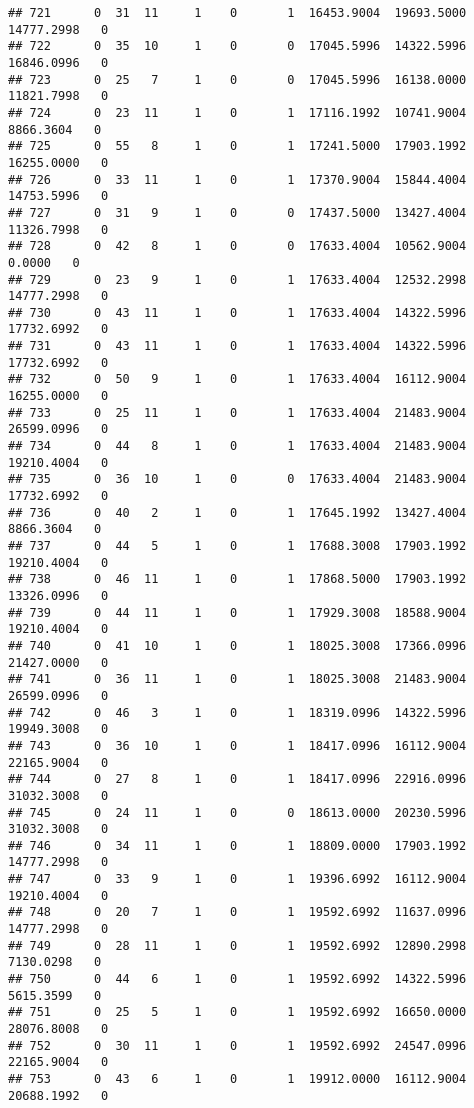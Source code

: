\documentclass[
]{article}
\begin{document}
\begin{enumerate}
\begin{verbatim}
## 721      0  31  11     1    0       1  16453.9004  19693.5000  14777.2998   0
## 722      0  35  10     1    0       0  17045.5996  14322.5996  16846.0996   0
## 723      0  25   7     1    0       0  17045.5996  16138.0000  11821.7998   0
## 724      0  23  11     1    0       1  17116.1992  10741.9004   8866.3604   0
## 725      0  55   8     1    0       1  17241.5000  17903.1992  16255.0000   0
## 726      0  33  11     1    0       1  17370.9004  15844.4004  14753.5996   0
## 727      0  31   9     1    0       0  17437.5000  13427.4004  11326.7998   0
## 728      0  42   8     1    0       0  17633.4004  10562.9004      0.0000   0
## 729      0  23   9     1    0       1  17633.4004  12532.2998  14777.2998   0
## 730      0  43  11     1    0       1  17633.4004  14322.5996  17732.6992   0
## 731      0  43  11     1    0       1  17633.4004  14322.5996  17732.6992   0
## 732      0  50   9     1    0       1  17633.4004  16112.9004  16255.0000   0
## 733      0  25  11     1    0       1  17633.4004  21483.9004  26599.0996   0
## 734      0  44   8     1    0       1  17633.4004  21483.9004  19210.4004   0
## 735      0  36  10     1    0       0  17633.4004  21483.9004  17732.6992   0
## 736      0  40   2     1    0       1  17645.1992  13427.4004   8866.3604   0
## 737      0  44   5     1    0       1  17688.3008  17903.1992  19210.4004   0
## 738      0  46  11     1    0       1  17868.5000  17903.1992  13326.0996   0
## 739      0  44  11     1    0       1  17929.3008  18588.9004  19210.4004   0
## 740      0  41  10     1    0       1  18025.3008  17366.0996  21427.0000   0
## 741      0  36  11     1    0       1  18025.3008  21483.9004  26599.0996   0
## 742      0  46   3     1    0       1  18319.0996  14322.5996  19949.3008   0
## 743      0  36  10     1    0       1  18417.0996  16112.9004  22165.9004   0
## 744      0  27   8     1    0       1  18417.0996  22916.0996  31032.3008   0
## 745      0  24  11     1    0       0  18613.0000  20230.5996  31032.3008   0
## 746      0  34  11     1    0       1  18809.0000  17903.1992  14777.2998   0
## 747      0  33   9     1    0       1  19396.6992  16112.9004  19210.4004   0
## 748      0  20   7     1    0       1  19592.6992  11637.0996  14777.2998   0
## 749      0  28  11     1    0       1  19592.6992  12890.2998   7130.0298   0
## 750      0  44   6     1    0       1  19592.6992  14322.5996   5615.3599   0
## 751      0  25   5     1    0       1  19592.6992  16650.0000  28076.8008   0
## 752      0  30  11     1    0       1  19592.6992  24547.0996  22165.9004   0
## 753      0  43   6     1    0       1  19912.0000  16112.9004  20688.1992   0

\end{verbatim}
\end{enumerate}
\end{document}
